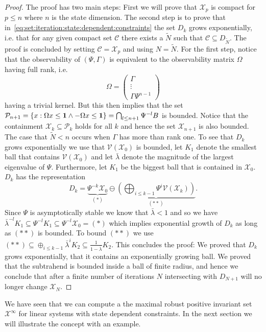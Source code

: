 \documentclass[letterpaper, 10pt, conference]{ieeeconf/ieeeconf} %
\begin{document}
\begin{proof}
The proof has two main steps: First we will prove that $\mathcal X_p$ is compact for $p\leq n$
where $n$ is the state dimension. The second step is to prove that in~\eqref{eq:set:iteration:state:dependent:constraints}
the set $D_k$ grows exponentially, i.e. that for any given compact set $\mathcal C$ there exists
a $\tilde N$ such that $\mathcal C\subseteq D_{\tilde N}$. The proof is concluded by setting 
$\mathcal C = \mathcal X_p$ and using $N = \tilde N$. For the first step, notice that the observability of
$(\Psi,\Gamma)$ is equivalent to the observability matrix $\Omega$ having full rank, i.e.
\[
\Omega = \left(\begin{array}{c}
\Gamma\\ \vdots \\ \Gamma\Psi^{n-1}
\end{array}\right)
\]
having a trivial kernel. But this then implies that the set $\mathcal P_{n+1} = \{x: 
\Omega x\leq{\bf{1}}\wedge-\Omega x\leq{\bf{1}}\} = \bigcap_{l\leq n+1} \Psi^{-l} B$ is bounded.
Notice that the containment $\mathcal X_k\subseteq \mathcal P_k$ holds for all $k$ and hence
the set $\mathcal X_{n+1}$ is also bounded. The case that $\tilde N<n$ occurs when $\Gamma$
has more than rank one. To see that $D_k$ grows exponentially we use that $\mathcal V(\mathcal X_0)$
is bounded, let $K_1$ denote the smallest ball that contains $\mathcal V(\mathcal X_0)$ and let
$\bar\lambda$ denote the magnitude of the largest eigenvalue of $\Psi$. Furthermore, let $K_1$
be the biggest ball that is contained in $\mathcal X_{0}$. $D_k$ has the representation
\begin{equation}
D_k = \underbrace{\Psi^{-k}\mathcal X_0}_{(\ast)} \ominus \underbrace{\left(\bigoplus_{i\leq k-1} 
\Psi^i\mathcal V(\mathcal X_k)\right)}_{(\ast\ast)}.
\end{equation}
Since $\Psi$ is asymptotically stable we know that $\bar\lambda<1$ and so we have 
$\bar\lambda^{-l}K_1\subseteq\Psi^{-l} K_1 \subseteq \Psi^{-l}\mathcal X_0 = (\ast)$
which implies exponential growth of $D_k$ as long as $(\ast\ast)$ is bounded.
To bound $(\ast\ast)$ we use $(\ast\ast)\subseteq \oplus_{i\leq k-1} \bar\lambda^i K_2 \subseteq
\frac{1}{1-\bar\lambda} K_2$. This concludes the proof: We proved that $D_k$ grows exponentially,
that it contains an exponentially growing ball. We proved that the subtrahend is bounded inside a ball of
finite radius, and hence we conclude that after a finite number of iterations $N$ intersecting with $D_{N+1}$
will no longer change $\mathcal X_N$.
\end{proof}
We have seen that we can compute a the maximal robust positive invariant set $\mathcal X^\infty$ for linear 
systems with state dependent constraints. In the next section we will illustrate the concept with an 
example.
\end{document}
